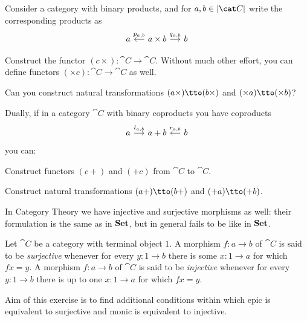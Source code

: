 \begin{exercise}
  Consider a category with binary products, and for
  \(a, b \in \obj{\cat C}\) write the corresponding products as
  \[\begin{tikzcd}[column sep=small]
      a & a \times b \ar["{p_{a,b}}", l, swap] \ar["{q_{a,b}}", r] & b
    \end{tikzcd}\]
  \begin{tcbenum}
  \item Construct the functor \((c \times) : \cat C \to \cat C\). Without
    much other effort, you can define functors
    \((\times c) : \cat C \to \cat C\) as well.
  \item Can you construct natural transformations
    \((a \times) \tto (b \times)\) and \((\times a) \tto (\times b)\)?
  \end{tcbenum}
  Dually, if in a category \(\cat C\) with binary coproducts you have
  coproducts
  \[\begin{tikzcd}[column sep=small]
      a \ar["{l_{a,b}}", r] & a+b & b \ar["{r_{a,b}}", l, swap]
    \end{tikzcd}\] you can:
  \begin{tcbenum}
  \item Construct functors \((c +)\) and \((+ c)\) from \(\cat C\) to
    \(\cat C\).
  \item Construct natural transformations \((a +) \tto (b +)\) and
    \((+ a) \tto (+ b)\).
  \end{tcbenum}
\end{exercise}

In Category Theory we have injective and surjective morphisms as well:
their formulation is the same as in \(\mathbf{Set}\), but in general fails to
be like in \(\mathbf{Set}\).

\begin{definition}
  Let \(\cat C\) be a category with terminal object \(1\). A morphism
  \(f : a \to b\) of \(\cat C\) is said to be {\em surjective} whenever
  for every \(y : 1 \to b\) there is some \(x : 1 \to a\) for which
  \(f x = y\). A morphism \(f : a \to b\) of \(\cat C\) is said to be
  {\em injective} whenever for every \(y : 1 \to b\) there is up to one
  \(x : 1 \to a\) for which \(f x = y\).
\end{definition}

Aim of this exercise is to find additional conditions within which
epic is equivalent to surjective and monic is equivalent to injective.

